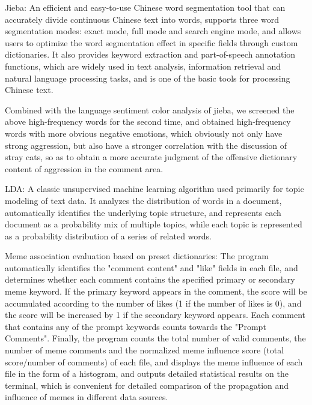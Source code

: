 \documentclass[12pt,a4paper]{ctexart}
\theoremstyle{MyLineTheoremStyle}
\theoremstyle{MyBlockTheoremStyle}
\theoremstyle{MySubsubsectionStyle}
\begin{document}
Jieba: An efficient and easy-to-use Chinese word segmentation tool that can accurately divide continuous Chinese text into words, supports three word segmentation modes: exact mode, full mode and search engine mode, and allows users to optimize the word segmentation effect in specific fields through custom dictionaries. It also provides keyword extraction and part-of-speech annotation functions, which are widely used in text analysis, information retrieval and natural language processing tasks, and is one of the basic tools for processing Chinese text.

Combined with the language sentiment color analysis of jieba, we screened the above high-frequency words for the second time, and obtained high-frequency words with more obvious negative emotions, which obviously not only have strong aggression, but also have a stronger correlation with the discussion of stray cats, so as to obtain a more accurate judgment of the offensive dictionary content of aggression in the comment area.

LDA\cite{blei2003latent}: A classic unsupervised machine learning algorithm used primarily for topic modeling of text data. It analyzes the distribution of words in a document, automatically identifies the underlying topic structure, and represents each document as a probability mix of multiple topics, while each topic is represented as a probability distribution of a series of related words.

Meme association evaluation based on preset dictionaries: The program automatically identifies the "comment content" and "like" fields in each file, and determines whether each comment contains the specified primary or secondary meme keyword. If the primary keyword appears in the comment, the score will be accumulated according to the number of likes (1 if the number of likes is 0), and the score will be increased by 1 if the secondary keyword appears. Each comment that contains any of the prompt keywords counts towards the "Prompt Comments". Finally, the program counts the total number of valid comments, the number of meme comments and the normalized meme influence score (total score/number of comments) of each file, and displays the meme influence of each file in the form of a histogram, and outputs detailed statistical results on the terminal, which is convenient for detailed comparison of the propagation and influence of memes in different data sources.
\end{document}

